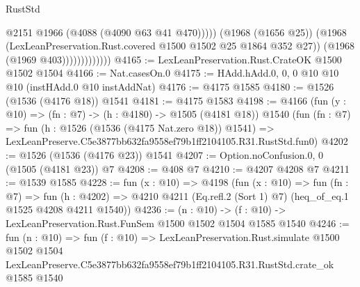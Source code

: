 \begin{lexlean}{RustStd}
\begin{coremodule}
                                @2151
                                @1966
                                (@4088 (@4090 @63 @41 @470)))))
                          (@1968 (@1656 @25))
                          (@1968 (LexLeanPreservation.Rust.covered @1500 @1502 @25 @1864 @352 @27))
                          (@1968 (@1969 @403)))))))))))))
@4165 := LexLeanPreservation.Rust.CrateOK @1500 @1502 @1504
@4166 := Nat.casesOn.{0}
@4175 := HAdd.hAdd.{0, 0, 0} @10 @10 @10 (instHAdd.{0} @10 instAddNat)
@4176 := @4175 @1585
@4180 := @1526 (@1536 (@4176 @18)) @1541
@4181 := @4175 @1583
@4198 := @4166
    (fun (y : @10) => (fn : @7) -> (h : @4180) -> @1505 (@4181 @18))
    @1540
    (fun (fn : @7) =>
    fun (h : @1526 (@1536 (@4175 Nat.zero @18)) @1541) =>
    LexLeanPreserve.C5e3877bb632fa9558ef79b1ff2104105.R31.RustStd.fun0)
@4202 := @1526 (@1536 (@4176 @23)) @1541
@4207 := Option.noConfusion.{0, 0} (@1505 (@4181 @23)) @7
@4208 := @408 @7
@4210 := @4207 @4208 @7
@4211 := @1539 @1585
@4228 := fun (x : @10) =>
  @4198
    (fun (x : @10) =>
    fun (fn : @7) =>
    fun (h : @4202) =>
    @4210 @4211 (Eq.refl.{2} (Sort 1) @7) (heq_of_eq.{1} @1525 @4208 @4211 @1540))
@4236 := (n : @10) -> (f : @10) -> LexLeanPreservation.Rust.FunSem @1500 @1502 @1504 @1585 @1540
@4246 := fun (n : @10) =>
  fun (f : @10) =>
  LexLeanPreservation.Rust.simulate
    @1500
    @1502
    @1504
    LexLeanPreserve.C5e3877bb632fa9558ef79b1ff2104105.R31.RustStd.crate_ok
    @1585
    @1540
\end{coremodule}
\end{lexlean}
